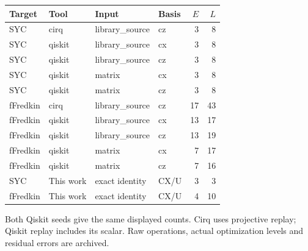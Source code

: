 \begin{center}\small\begin{tabular}{llllrr}\toprule
Target & Tool & Input & Basis & $E$ & $L$\\\midrule
SYC & cirq & library\_source & cz & 3 & 8\\
SYC & qiskit & library\_source & cx & 3 & 8\\
SYC & qiskit & library\_source & cz & 3 & 8\\
SYC & qiskit & matrix & cx & 3 & 8\\
SYC & qiskit & matrix & cz & 3 & 8\\
fFredkin & cirq & library\_source & cz & 17 & 43\\
fFredkin & qiskit & library\_source & cx & 13 & 17\\
fFredkin & qiskit & library\_source & cz & 13 & 19\\
fFredkin & qiskit & matrix & cx & 7 & 17\\
fFredkin & qiskit & matrix & cz & 7 & 16\\
SYC & This work & exact identity & CX/U & 3 & 3\\
fFredkin & This work & exact identity & CX/U & 4 & 10\\
\bottomrule\end{tabular}\end{center}
Both Qiskit seeds give the same displayed counts. Cirq uses projective replay; Qiskit replay includes its scalar. Raw operations, actual optimization levels and residual errors are archived.
